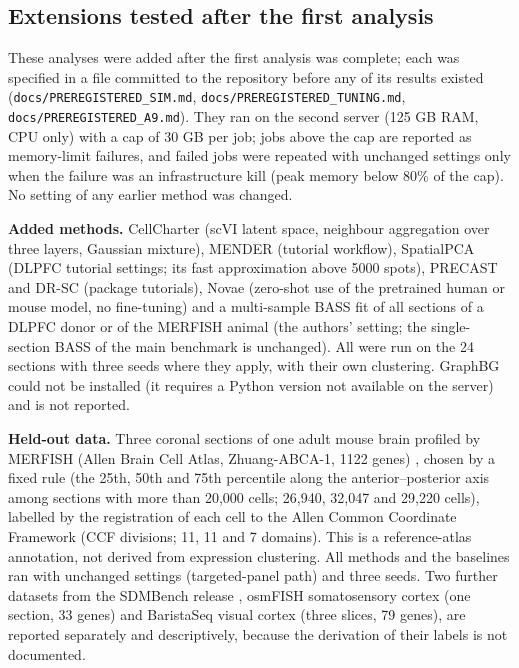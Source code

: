 \documentclass[unnumsec,webpdf,contemporary,large]{oup-authoring-template}
\begin{document}
\subsection{Extensions tested after the first analysis}
These analyses were added after the first analysis was complete; each was specified in a file committed to the repository before any of
its results existed (\texttt{docs/PREREGISTERED\_SIM.md}, \texttt{docs/PREREGISTERED\_TUNING.md}, \texttt{docs/PREREGISTERED\_A9.md}). They
ran on the second server (125 GB RAM, CPU only) with a cap of 30 GB per job; jobs above the cap are reported as memory-limit failures, and
failed jobs were repeated with unchanged settings only when the failure was an infrastructure kill (peak memory below 80\% of the cap).
No setting of any earlier method was changed.

\textbf{Added methods.} CellCharter \citep{varrone2024cellcharter} (scVI latent space, neighbour aggregation over three layers, Gaussian
mixture), MENDER \citep{yuan2024mender} (tutorial workflow), SpatialPCA \citep{shang2022spatialpca} (DLPFC tutorial settings; its fast
approximation above 5000 spots), PRECAST \citep{liu2023precast} and DR-SC \citep{liu2022drsc} (package tutorials), Novae
\citep{blampey2025novae} (zero-shot use of the pretrained human or mouse model, no fine-tuning) and a multi-sample BASS fit of all sections
of a DLPFC donor or of the MERFISH animal (the authors' setting; the single-section BASS of the main benchmark is unchanged). All were run
on the 24 sections with three seeds where they apply, with their own clustering. GraphBG could not be installed (it requires a Python
version not available on the server) and is not reported.

\textbf{Held-out data.} Three coronal sections of one adult mouse brain profiled by MERFISH (Allen Brain Cell Atlas, Zhuang-ABCA-1, 1122
genes) \citep{zhang2023abca}, chosen by a fixed rule (the 25th, 50th and 75th percentile along the anterior--posterior axis among sections with
more than 20,000 cells; 26,940, 32,047 and 29,220 cells), labelled by the registration of each cell to the Allen Common Coordinate Framework
(CCF divisions; 11, 11 and 7 domains). This is a reference-atlas annotation, not derived from expression clustering. All \nMethodsPub{}
methods and the baselines ran with unchanged settings (targeted-panel path) and three seeds. Two further datasets from the SDMBench release
\citep{yuan2024benchmark}, osmFISH somatosensory cortex \citep{codeluppi2018osmfish} (one section, 33 genes) and BaristaSeq visual cortex
\citep{sun2021baristaseq} (three slices, 79 genes), are reported separately and descriptively, because the derivation of their labels is not
documented.
\end{document}
